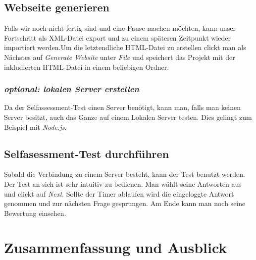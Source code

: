 \documentclass[a4paper,12pt,headsepline,twocolumn]{scrartcl}
\begin{document}
\subsection{Webseite generieren}
Falls wir noch nicht fertig sind und eine Pause machen möchten, kann unser Fortschritt als XML-Datei export und zu einem späteren Zeitpunkt wieder importiert werden.\newline Um die letztendliche HTML-Datei zu erstellen clickt man als Nächstes auf \textit{Generate Website} unter \textit{File} und speichert das Projekt mit der inkludierten HTML-Datei in einem beliebigen Ordner.
\subsubsection*{\textit{optional: lokalen Server erstellen}}
Da der Selfassessment-Test einen Server benötigt, kann man, falls man keinen Server besitzt, auch das Ganze auf einem Lokalen Server testen. Dies gelingt zum Beispiel mit \textit{Node.js}.
\subsection{Selfasessment-Test durchführen}
Sobald die Verbindung zu einem Server besteht, kann der Test benutzt werden. Der Test an sich ist sehr intuitiv zu bedienen. Man wählt seine Antworten aus und clickt auf \textit{Next}. Sollte der Timer ablaufen wird die eingeloggte Antwort genommen und zur nächsten Frage gesprungen. Am Ende kann man noch seine Bewertung einsehen.

\section{Zusammenfassung und Ausblick}

\onecolumn
\singlespacing
\newpage
{}
\renewcommand\refname{Literaturverzeichnis}


\end{document}
